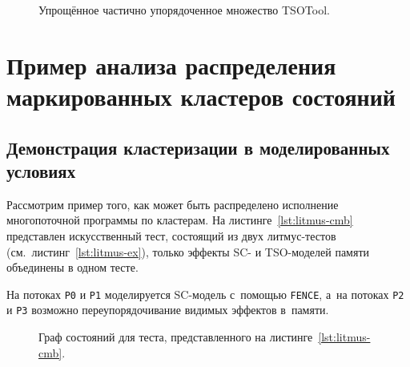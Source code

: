 \begin{figure}[htbp]
  \centerfloat{
    
  }
  \caption{Упрощённое частично упорядоченное множество TSOTool.}
  \label{fig:manovit-like}
\end{figure}

\section{Пример анализа распределения маркированных кластеров состояний}
\label{sec:ch5/dist}

\subsection{Демонстрация кластеризации в моделированных условиях}
\label{sec:ch5/dist-demo}

Рассмотрим пример того, как может быть распределено исполнение
многопоточной программы по кластерам.
На листинге~\ref{lst:litmus-cmb} представлен искусственный тест,
состоящий из двух литмус-тестов (см.~листинг~\ref{lst:litmus-ex}),
только эффекты SC- и TSO-моделей памяти объединены в одном тесте.

\begin{minipage}[ht]{\textwidth}
  \centering
  
\end{minipage}

На потоках \texttt{P0} и \texttt{P1} моделируется SC-модель с~помощью
\texttt{FENCE}, а~на потоках \texttt{P2} и \texttt{P3} возможно
переупорядочивание видимых эффектов в~памяти.

\begin{figure}[ht]
  \centerfloat{
    
  }
  \caption{Граф состояний для теста, представленного на
  листинге~\ref{lst:litmus-cmb}.}
  \label{fig:combined-litmus}
\end{figure}


